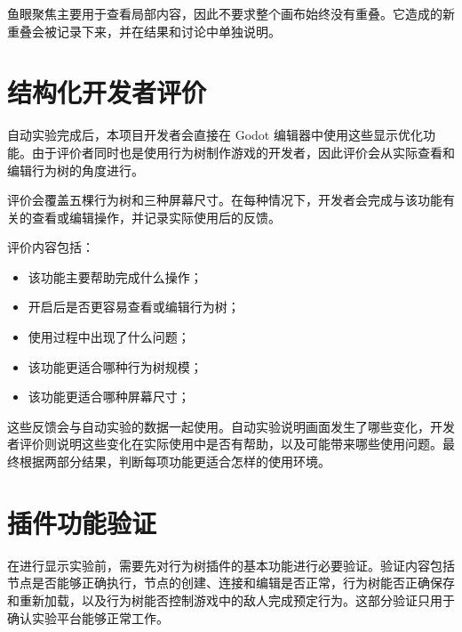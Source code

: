 \documentclass[11pt,a4paper,oneside,extrafontsizes]{memoir}
\begin{document}
鱼眼聚焦主要用于查看局部内容，因此不要求整个画布始终没有重叠。它造成的新重叠会被记录下来，并在结果和讨论中单独说明。

\section{结构化开发者评价}

自动实验完成后，本项目开发者会直接在 Godot 编辑器中使用这些显示优化功能。由于评价者同时也是使用行为树制作游戏的开发者，因此评价会从实际查看和编辑行为树的角度进行。

评价会覆盖五棵行为树和三种屏幕尺寸。在每种情况下，开发者会完成与该功能有关的查看或编辑操作，并记录实际使用后的反馈。

评价内容包括：

\begin{itemize}[leftmargin=*]
\item 该功能主要帮助完成什么操作；
\end{itemize}

\begin{itemize}[leftmargin=*]
\item 开启后是否更容易查看或编辑行为树；
\end{itemize}

\begin{itemize}[leftmargin=*]
\item 使用过程中出现了什么问题；
\end{itemize}

\begin{itemize}[leftmargin=*]
\item 该功能更适合哪种行为树规模；
\end{itemize}

\begin{itemize}[leftmargin=*]
\item 该功能更适合哪种屏幕尺寸；
\end{itemize}

这些反馈会与自动实验的数据一起使用。自动实验说明画面发生了哪些变化，开发者评价则说明这些变化在实际使用中是否有帮助，以及可能带来哪些使用问题。最终根据两部分结果，判断每项功能更适合怎样的使用环境。

\section{插件功能验证}

在进行显示实验前，需要先对行为树插件的基本功能进行必要验证。验证内容包括节点是否能够正确执行，节点的创建、连接和编辑是否正常，行为树能否正确保存和重新加载，以及行为树能否控制游戏中的敌人完成预定行为。这部分验证只用于确认实验平台能够正常工作。
\end{document}
